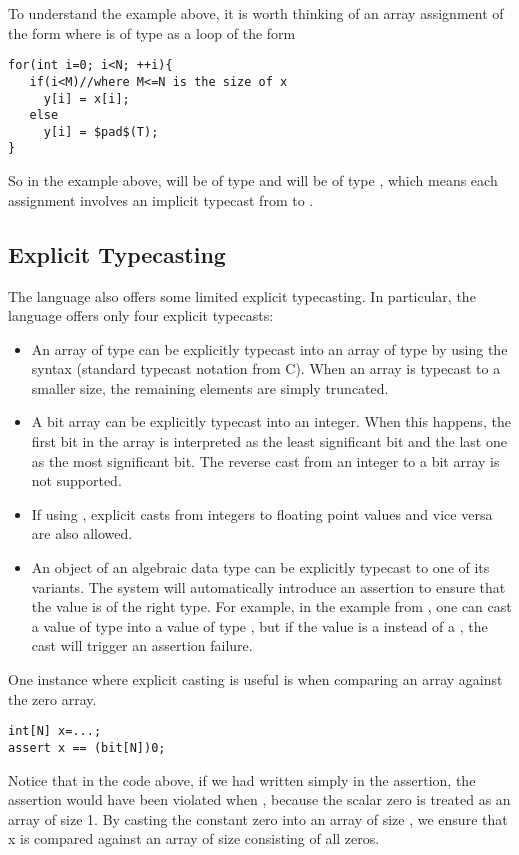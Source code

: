 To understand the example above, it is worth thinking of an array assignment of the form  where  is of type  as a loop of the form
\begin{lstlisting}
for(int i=0; i<N; ++i){
   if(i<M)//where M<=N is the size of x
     y[i] = x[i];
   else
     y[i] = $pad$(T);
}
\end{lstlisting}
So in the example above,  will be of type  and  will be of type , which means each assignment involves an implicit typecast from  to .


\subsection{Explicit Typecasting}
The \Sk{} language also offers some limited explicit typecasting. In particular, the language offers only four explicit typecasts:
\begin{itemize}

\item An array  of type  can be explicitly typecast into an array of type  by using the syntax  (standard typecast notation from C). When an array is typecast to a smaller size, the remaining elements are simply truncated.

\item A bit array  can be explicitly typecast into an integer. When this happens, the first bit in the array is interpreted as the least significant bit and the last one as the most significant bit. The reverse cast from an integer to a bit array is not supported.

\item If using , explicit casts from integers to floating point values and vice versa are also allowed.
\item An object of an algebraic data type can be explicitly typecast to one of its variants. The system will automatically introduce an assertion to ensure that the value is of the right type. For example, in the  example from , one can cast a value of type  into a value of type , but if the value is a  instead of a , the cast will trigger an assertion failure.
\end{itemize}

\begin{Example}
One instance where explicit casting is useful is when comparing an array against the zero array.
\begin{lstlisting}
int[N] x=...;
assert x == (bit[N])0;
\end{lstlisting}
Notice that in the code above, if we had written simply  in the assertion, the assertion would have been violated when , because the scalar zero is treated as an array of size 1. By casting the constant zero into an array of size , we ensure that x is compared against an array of size  consisting of all zeros.
\end{Example}

